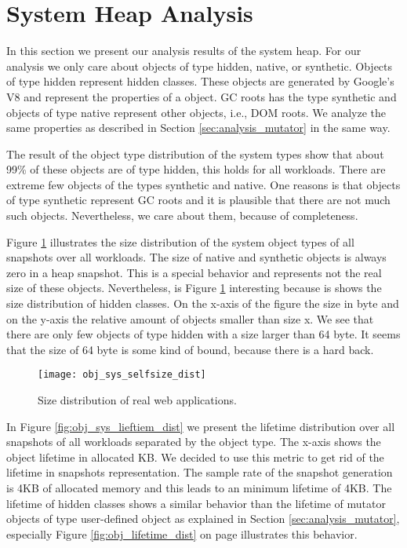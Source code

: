 
\section{System Heap Analysis}  \label{sec:analysis_system}

In this section we present our analysis results of the system heap. For our analysis we only care about objects of type hidden, native, or synthetic. Objects of type hidden represent hidden classes. These objects are generated by Google's V8 and represent the properties of a object. GC roots has the type synthetic and objects of type native represent other objects, i.e., DOM roots. We analyze the same properties as described in Section \ref{sec:analysis_mutator} in the same way.

The result of the object type distribution of the system types show that about 99\% of these objects are of type hidden, this holds for all workloads. There are extreme few objects of the types synthetic and native. One reasons is that objects of type synthetic represent GC roots and it is plausible that there are not much such objects. Nevertheless, we care about them, because of completeness.

Figure \ref{fig:obj_sys_selfsize_dist} illustrates the size distribution of the system object types of all snapshots over all workloads. The size of native and synthetic objects is always zero in a heap snapshot. This is a special behavior and represents not the real size of these objects. Nevertheless, is Figure \ref{fig:obj_sys_selfsize_dist} interesting because is shows the size distribution of hidden classes. On the x-axis of the figure the size in byte and on the y-axis the relative amount of objects smaller than size x. We see that there are only few objects of type hidden with a size larger than 64 byte. It seems that the size of 64 byte is some kind of bound, because there is a hard back. 

\begin{figure}
	\centering
	\texttt{[image: obj\_sys\_selfsize\_dist]}
	\caption{Size distribution of real web applications.}
	\label{fig:obj_sys_selfsize_dist}
\end{figure}

In Figure \ref{fig:obj_sys_lieftiem_dist} we present the lifetime distribution over all snapshots of all workloads separated by the object type. The x-axis shows the object lifetime in allocated KB. We decided to use this metric to get rid of the lifetime in snapshots representation. The sample rate of the snapshot generation is 4KB of allocated memory and this leads to an minimum lifetime of 4KB. The lifetime of hidden classes shows a similar behavior than the lifetime of mutator objects of type user-defined object as explained in Section \ref{sec:analysis_mutator}, especially Figure \ref{fig:obj_lifetime_dist} on page \pageref{fig:obj_lifetime_dist} illustrates this behavior.

